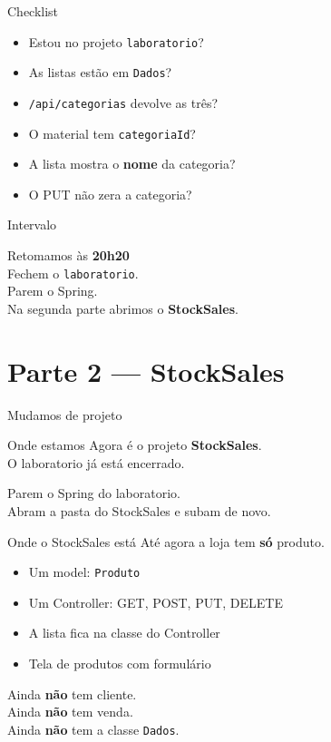 \documentclass[aspectratio=169,11pt]{beamer}
\newcommand{\onde}[1]{%
  \begin{block}{Onde estamos}
    #1
  \end{block}
}
\begin{document}
\begin{frame}{Checklist}
  \begin{itemize}
    \item [ ] Estou no projeto \texttt{laboratorio}?
    \item [ ] As listas estão em \texttt{Dados}?
    \item [ ] \texttt{/api/categorias} devolve as três?
    \item [ ] O material tem \texttt{categoriaId}?
    \item [ ] A lista mostra o \textbf{nome} da categoria?
    \item [ ] O PUT não zera a categoria?
  \end{itemize}
\end{frame}

\begin{frame}{Intervalo}
  \begin{center}
    \Large Retomamos às \textbf{20h20}\\[0.8em]
    \normalsize
    Fechem o \texttt{laboratorio}.\\
    Parem o Spring.\\
    Na segunda parte abrimos o \textbf{StockSales}.
  \end{center}
\end{frame}

\section{Parte 2 --- StockSales}

\begin{frame}{Mudamos de projeto}
  \onde{Agora é o projeto \textbf{StockSales}.\\
        O laboratorio já está encerrado.}

  Parem o Spring do laboratorio.\\
  Abram a pasta do StockSales e subam de novo.
\end{frame}

\begin{frame}{Onde o StockSales está}
  Até agora a loja tem \textbf{só} produto.

  \vspace{0.4em}
  \begin{itemize}
    \item Um model: \texttt{Produto}
    \item Um Controller: GET, POST, PUT, DELETE
    \item A lista fica na classe do Controller
    \item Tela de produtos com formulário
  \end{itemize}

  \vspace{0.5em}
  Ainda \textbf{não} tem cliente.\\
  Ainda \textbf{não} tem venda.\\
  Ainda \textbf{não} tem a classe \texttt{Dados}.
\end{frame}
\end{document}
